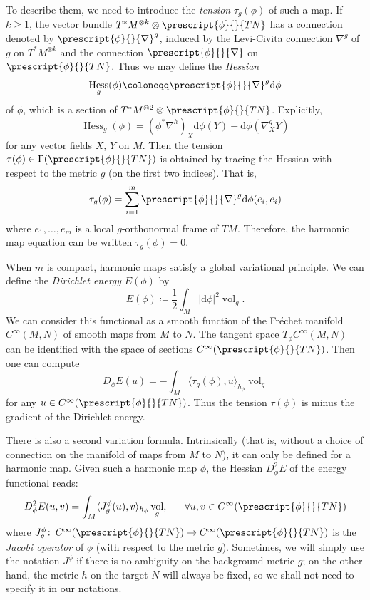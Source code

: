 \documentclass{article}
\numberwithin{equation}{section}        %
\theoremstyle{bfnote}
\theoremstyle{definition}
\theoremstyle{bfremark}
\newcommand{\col}{\colon \thinspace}        %
\newcommand{\diff}{\mathrm{d}}                      %
\DeclareMathOperator{\vol}{vol}                 %
\DeclareMathOperator{\Hess}{Hess}               %
\begin{document}
To describe them, we need to introduce the \emph{tension} $\tau_g(\phi)$ of such a map. If $k \geq 1$, the vector bundle $T^*M^{\otimes k} \otimes \prescript{\phi}{}{TN}$ has a connection denoted by $\prescript{\phi}{}{\nabla}^{g}$, induced by the Levi-Civita connection $\nabla^{g}$ of $g$ on $T^*M^{\otimes k}$ and the connection $\prescript{\phi}{}{\nabla}$ on $\prescript{\phi}{}{TN}$. Thus we may define the \emph{Hessian}
\begin{equation}
    \Hess_g(\phi) \coloneqq \prescript{\phi}{}{\nabla}^{g} \diff\phi
\end{equation}
of $\phi$, which is a section of $T^*M^{\otimes 2} \otimes \prescript{\phi}{}{TN}$. Explicitly, 
\begin{equation*}
    \Hess_g(\phi) = (\phi^*\nabla^{h})_X \diff\phi(Y) - \diff\phi(\nabla^{g}_X Y) 
\end{equation*}
for any vector fields $X$, $Y$ on $M$. Then the tension $\tau(\phi) \in \Gamma(\prescript{\phi}{}{TN})$ is obtained by tracing the Hessian with respect to the metric $g$ (on the first two indices). That is,
\begin{equation*}
    \tau_g(\phi) = \sum_{i=1}^m \prescript{\phi}{}{\nabla}^{g} \diff\phi (e_i,e_i) 
\end{equation*}
where $e_1,\ldots,e_m$ is a local $g$-orthonormal frame of $TM$. Therefore, the harmonic map equation can be written $\tau_g(\phi) = 0$.

When $m$ is compact, harmonic maps satisfy a global variational principle. We can define the \emph{Dirichlet energy} $E(\phi)$ by 
\begin{equation*}
    E(\phi) \coloneqq \frac{1}{2} \int_M |\diff\phi|^2 \vol_g .
\end{equation*}
We can consider this functional as a smooth function of the Fr\'echet manifold $C^\infty(M,N)$ of smooth maps from $M$ to $N$. The tangent space $T_\phi C^\infty(M,N)$ can be identified with the space of sections $C^\infty(\prescript{\phi}{}{TN})$. Then one can compute
\begin{equation*}
    D_\phi E(u) = - \int_M \langle \tau_g(\phi), u \rangle_{h_\phi} \vol_g
\end{equation*}
for any $u \in C^\infty(\prescript{\phi}{}{TN})$. Thus the tension $\tau(\phi)$ is minus the gradient of the Dirichlet energy. 

There is also a second variation formula. Intrinsically (that is, without a choice of connection on the manifold of maps from $M$ to $N$), it can only be defined for a harmonic map. Given such a harmonic map $\phi$, the Hessian $D^2_\phi E$ of the energy functional reads:
\begin{equation*}
    D^2_\phi E(u,v) = \int_M \langle J^\phi_g(u), v \rangle_{h_\phi} \vol_g , ~~~~~ \forall u, v \in C^\infty (\prescript{\phi}{}{TN})
\end{equation*}
where $J^\phi_g \col C^\infty(\prescript{\phi}{}{TN}) \rightarrow C^\infty (\prescript{\phi}{}{TN})$ is the \emph{Jacobi operator} of $\phi$ (with respect to the metric $g$). Sometimes, we will simply use the notation $J^\phi$ if there is no ambiguity on the background metric $g$; on the other hand, the metric $h$ on the target $N$ will always be fixed, so we shall not need to specify it in our notations. 
\end{document}
